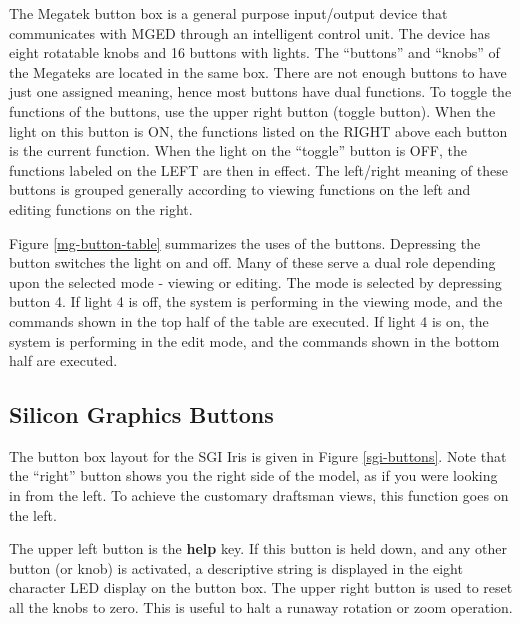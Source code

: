 The Megatek button box
is a general purpose input/output device that communicates with
MGED through an intelligent control unit.  The device has eight
rotatable knobs and 16 buttons with lights.
The ``buttons'' and ``knobs'' of the Megateks are located in the same box.
There are not enough buttons to have just one assigned meaning, hence
most buttons have dual functions.
To toggle the functions of the buttons,
use the upper right button (toggle button).
When the light on this button is ON, the functions listed on the RIGHT above
each button is the current function.
When the light on the ``toggle'' button is OFF, the functions labeled on the
LEFT are then in effect.
The left/right meaning of these buttons is grouped generally according to
viewing functions on the left and editing functions on the right.

Figure \ref{mg-button-table}
summarizes the uses of the buttons.
Depressing the button switches the light on and off.  Many of these serve a
dual role depending upon the selected mode - viewing or editing.  The mode is
selected by depressing button 4.  If light 4 is off, the system is performing
in the viewing mode, and the commands shown in the top half of the table are
executed.  If light 4 is on, the system is performing in the edit mode, and
the commands shown in the bottom half are executed.

\subsection{Silicon Graphics Buttons}

The button box layout for the SGI Iris is given
in Figure \ref{sgi-buttons}.
Note that the ``right'' button shows you the right side of the
model, as if you were looking in from the left.
To achieve the customary draftsman views, this function
goes on the left.

The upper left button is the {\bf help} key.
If this button is held down, and any other button (or knob)
is activated, a descriptive string is displayed in the eight character
LED display on the button box.
The upper right button is used to reset all the knobs to zero.
This is useful to halt a runaway rotation or zoom operation.

